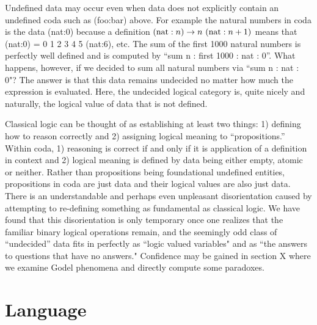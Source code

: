 \documentclass[11pt]{article}
\begin{document}
Undefined data may occur even when data does not explicitly contain an undefined coda such as (foo:bar) above. For example 
the natural numbers in coda is the data (nat:0) because a definition $({\rm nat}:n)\rightarrow n\ ({\rm nat}:n+1)$ means that (nat:0) = 0 1 2 3 4 5 (nat:6), etc.  
The sum of the first 1000 natural numbers is perfectly well defined and is computed by ``sum n : first 1000 : nat : 0''.  What happens, however, 
if we decided to sum all natural numbers via ``sum n : nat : 0"?  The answer is that this data remains undecided no matter how much the 
expression is evaluated.  Here, the undecided logical category is, quite nicely and naturally, the logical value of data that is not defined.  

Classical logic can be thought of as establishing at least two things: 1) defining how to reason correctly and 2) assigning logical meaning to ``propositions.''  
Within coda, 1) reasoning is correct if and only if it is application of a definition in context and 2) logical meaning is defined by data being either empty, atomic or neither.  
Rather than propositions being foundational undefined entities, propositions in coda are just data and their logical values are also just data.  
There is an understandable and perhaps even unpleasant disorientation caused by attempting to re-defining something 
as fundamental as classical logic.  We have found that this disorientation is only temporary once one realizes that the familiar binary logical operations remain,
 and the seemingly odd class of ``undecided'' data fits in perfectly as ``logic valued variables" and as ``the answers to questions that have no answers."  Confidence may 
 be gained in section X where we examine Godel phenomena and directly compute some paradoxes. 

\section{Language}
\end{document}

